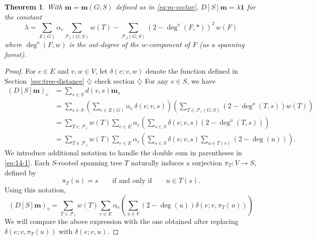 \documentclass{amsart}
\newtheorem{thm}{Theorem}
\theoremstyle{definition}
\newcommand{\boldm}{\mathbf{m}}
\newcommand{\trees}{\mathcal{F}_1}
\newcommand{\forests}{\mathcal{F}}
\newcommand{\degout}{\deg^o}
\newcommand{\note}[1]{{\color{red} \sf $\diamondsuit$  {#1} $\diamondsuit$ }}
\begin{document}
\begin{thm}
With $\boldm = \boldm(G;S)$ defined as in \eqref{eq:m-vector},
$D[S] \boldm = \lambda \mathbf{1}$
for the constant
\begin{equation}
	\lambda = \sum_{E(G)} \alpha_e \sum_{\trees(G;S)} w(T) - \sum_{\forests_2(G;S)} (2 - \degout(F,*) )^2 \, w(F)
\end{equation}
where 
$\degout(F,w)$ is the out-degree of the $w$-component of $F$ (as a spanning forest).
\end{thm}
\begin{proof}
For $e\in E$ and $v,w\in V$, let $\delta(e;v,w)$ denote the function defined in Section~\ref{sec:tree-distance} \note{check section}
For any $v \in S$, we have
\begin{align}
  (D[S] \boldm)_v &= \sum_{s \in S} d(v,s) \boldm_s \\
  &= \sum_{s \in S} \left( \sum_{e \in E(G)} \alpha_e\, \delta(e; v,s) \right) \left( \sum_{T \in \trees(G;S)} (2 - \degout(T,s)) w(T) \right) \\
  &= \sum_{T\in \trees} w(T) \sum_{e\in E} \alpha_e \left( \sum_{s \in S} \delta(e; v,s) (2 - \deg^o(T, s)) \right) \\
  &= \sum_{T \in \trees} w(T) \sum_{e \in E} \alpha_e \left( \sum_{s \in S} \delta(e; v,s) \sum_{u \in T(s)} (2 - \deg(u)) \right). \label{eq:14-1}
\end{align}
We introduce additional notation to handle the double sum in parentheses in \eqref{eq:14-1}.
Each $S$-rooted spanning tree $T$ naturally induces a surjection $\pi_T: V \to S$, defined by 
\[
	\pi_T(u) = s \qquad\text{if and only if}\qquad u \in T(s).
\]
Using this notation,
\[
	(D[S] \boldm)_v = \sum_{T \in \trees} w(T) \sum_{e \in E} \alpha_e \left( \sum_{u \in V} (2 - \deg(u)) \delta(e; v,\pi_T(u)) \right)
\]
We will compare the above expression with the one obtained after replacing $\delta(e; v,\pi_T(u))$ with $\delta(e; v, u)$.

\end{proof}
\end{document}
